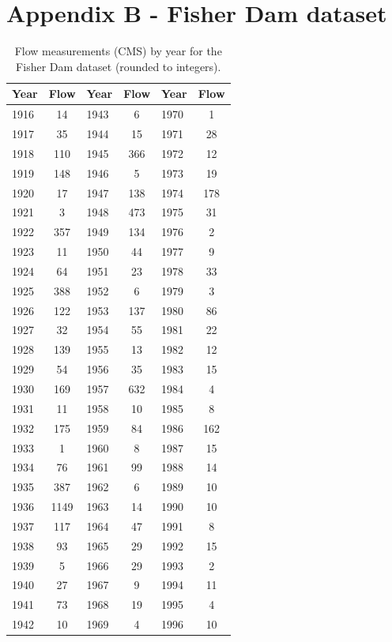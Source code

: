 \section*{Appendix B - Fisher Dam dataset}

\renewcommand{\arraystretch}{1.2}
\begin{table}[H]
\centering
\caption{Flow measurements (CMS) by year for the Fisher Dam dataset (rounded to integers).}
\begin{tabular}{l c | l c | l c}
\hline
\textbf{Year} & \textbf{Flow} & \textbf{Year} & \textbf{Flow} & \textbf{Year} & \textbf{Flow} \\ \hline
1916 & 14   & 1943 & 6    & 1970 & 1    \\
1917 & 35   & 1944 & 15   & 1971 & 28   \\
1918 & 110  & 1945 & 366  & 1972 & 12   \\
1919 & 148  & 1946 & 5    & 1973 & 19   \\
1920 & 17   & 1947 & 138  & 1974 & 178  \\
1921 & 3    & 1948 & 473  & 1975 & 31   \\
1922 & 357  & 1949 & 134  & 1976 & 2    \\
1923 & 11   & 1950 & 44   & 1977 & 9    \\
1924 & 64   & 1951 & 23   & 1978 & 33   \\
1925 & 388  & 1952 & 6    & 1979 & 3    \\
1926 & 122  & 1953 & 137  & 1980 & 86   \\
1927 & 32   & 1954 & 55   & 1981 & 22   \\
1928 & 139  & 1955 & 13   & 1982 & 12   \\
1929 & 54   & 1956 & 35   & 1983 & 15   \\
1930 & 169  & 1957 & 632  & 1984 & 4    \\
1931 & 11   & 1958 & 10   & 1985 & 8    \\
1932 & 175  & 1959 & 84   & 1986 & 162  \\
1933 & 1    & 1960 & 8    & 1987 & 15   \\
1934 & 76   & 1961 & 99   & 1988 & 14   \\
1935 & 387  & 1962 & 6    & 1989 & 10   \\
1936 & 1149 & 1963 & 14   & 1990 & 10   \\
1937 & 117  & 1964 & 47   & 1991 & 8    \\
1938 & 93   & 1965 & 29   & 1992 & 15   \\
1939 & 5    & 1966 & 29   & 1993 & 2    \\
1940 & 27   & 1967 & 9    & 1994 & 11   \\
1941 & 73   & 1968 & 19   & 1995 & 4    \\
1942 & 10   & 1969 & 4    & 1996 & 10   \\ \hline
\end{tabular}
\label{table:OCD_flows}
\end{table}

